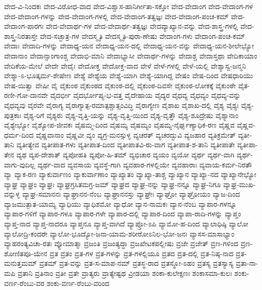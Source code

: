 {ವೇದ-ವಿ-ನಿಂದಕಃ
ವೇದ-ವಿರೋಧ-ವಾದ
ವೇದ-ವಿಶ್ವಾಸ-ಹಾನಿರ್ಗೀತಾ-ಸಕ್ತೋ
ವೇದ-ವೇದಾಂಗ
ವೇದ-ವೇದಾಂಗ-ಗಳ
ವೇದ-ವೇದಾಂಗ-ಗಳನ್ನು
ವೇದ-ವೇದಾಂಗ-ಗಳಲ್ಲಿ
ವೇದ-ವೇದಾಂಗ-ತತ್ವಜ್ಞಃ
ವೇದ-ವೇದಾಂಗ-ಪಂಚ-ಕಮ್
ವೇದ-ವೇದಾಂಗ-ಪಾರಗಃ
ವೇದ-ವೇದಾರ್ಥ-ಗಳ
ವೇದ-ವೇದಾರ್ಥ-ತತ್ವಜ್ಞಃ
ವೇದವ್ಯಾಖ್ಯಾನ-ವನ್ನು
ವೇದ-ಶಾಸ್ತ್ರ-ಗಳಲ್ಲಿ
ವೇದ-ಶಾಸ್ತ್ರ-ನಿರತಾಸ್ತೇ
ವೇದ-ಸಚ್ಛಾತ್ರ-ಗಳ
ವೇದಸ್ಮೃತಿ
ವೇದಸ್ಮೃತಿ-ಪುರಾ-ಣೇಷು
ವೇದಾಂಗ-ಗಳು
ವೇದಾಂಗ-ಪಂಚ-ಕಮ್
ವೇದಾಃ
ವೇದಾದಿ-ಗಳನ್ನು
ವೇದಾಧ್ಯ-ಯನ
ವೇದಾಧ್ಯ-ಯನ-ದಲ್ಲಿ
ವೇದಾಧ್ಯ-ಯನ-ವನ್ನು
ವೇದಾಧ್ಯ-ಯನ-ಶೀಲೇಭ್ಯೋ
ವೇದಾನಾಂ
ವೇದಾನ್ಸಾಂಗಾಂಶ್ಚ
ವೇದಾಭಿ-ಮಾನಿ
ವೇದಾಭ್ಯಾಸೀ
ವೇದಾರ್ಥ-ಗಳನ್ನು
ವೇದಾಶ್ಚ
ವೇದಾಸ್ತಥಾ
ವೇದಿಕಾಯಾಂ
ವೇದಿಕೆಯ-ಮೇಲೆ
ವೇದೇ
ವೇದೈಃ
ವೇದೋಕ್ತ
ವೇದೋಕ್ತ-ವಾದ
ವೇಳೆ
ವೇಳೆ-ಗಳಲ್ಲಿ
ವೇಳೆ-ಯಲ್ಲಿ
ವೇಶ್ಯಾಸ್ವ-ಜನ್ಮನಿ
ವೇಶ್ಯಾ-ಽ-ಭೂತ್ಕರ್ಮ-ಶೇಷೇಣ
ವೇಶ್ಯೆ
ವೇಶ್ಯೆಯ
ವೇಶ್ಯೆ-ಯಾಗಿ
ವೇಶ್ಯೆ-ಯಾಗಿದ್ದ
ವೇಷಂ
ವೇಷ-ದಿಂದ
ವೇಷಧಾರಿಯು
ವೇಷ-ಯಿತ್ವಾ
ವೇಷೀ
ವೈ
ವೈಕುಂಠ
ವೈಕುಂಠದ
ವೈಕುಂಠ-ದಲ್ಲಿ
ವೈಕುಂಠ-ದಿವಸೇ
ವೈಕುಂಠ-ಲೋಕಕ್ಕೆ
ವೈಕುಂಠೇ
ವೈತ-ರಣೀ-ಗೋ-ದಾನವೇ
ವೈದರ್ಭೀ
ವೈದರ್ಭೋಪ್ಯ-ಭ-ವತ್ತ
ವೈದೇಹಾಯ
ವೈದ್ಯರ
ವೈಧವ್ಯ
ವೈಧವ್ಯಂ
ವೈಧವ್ಯ-ವನ್ನು
ವೈಧವ್ಯವು
ವೈರವೇ
ವೈರಾಗ್ಯ
ವೈರಾಗ್ಯಾತ್ಪ-ರಮಾತ್ಪಶ್ಚಾತ್ಸಂವಿದ್ಧಿ
ವೈರಾಗ್ಯೇಣ
ವೈಶಾಖ
ವೈಶಾಖ-ದಲ್ಲಿ
ವೈಶ್ಯ
ವೈಶ್ಯಃ
ವೈಶ್ಯ-ಪುತ್ರಕಾಃ
ವೈಶ್ಯ-ರಿಗೆ
ವೈಶ್ಯರು
ವೈಶ್ಯ-ವೃತ್ತಿ-ಯನ್ನು
ವೈಶ್ಯ-ವೃತ್ತಿ-ಯಿಂದ
ವೈಶ್ಯ-ವೃತ್ತೌ
ವೈಶ್ಯ-ಶೂದ್ರೇಷು
ವೈಶ್ಯಾನಾಂ
ವೈಶ್ಯೇಭ್ಯೋ
ವೈಶ್ಯೋಪ-ಜೀವಕಃ
ವೈಷಮ್ಮ-ದಿಂದ
ವೈಷಮ್ಯ
ವೈಷಮ್ಯಂ
ವೈಷಮ್ಯ-ನೈರ್ಘೃಣ್ಯಾಧಿಕ-ರಣ
ವೈಷ್ಣವ
ವೈಷ್ಣವ-ಧರ್ಮ-ದಿಂದ
ವೈಷ್ಣವಾನಾಂ
ವೈಷ್ಣವೀ
ವ್ಯಂ
ವ್ಯಗ್ರ-ಮನಸ್ಸುಳ್ಳ
ವ್ಯಚರತ್
ವ್ಯಚರದ್ಭುವಿ
ವ್ಯಜಹಾರ
ವ್ಯತಿಕ್ರಮೇತ್
ವ್ಯತೀ-ತಾನಿ
ವ್ಯತೀತ್ಯೇವ
ವ್ಯತೀಪಾತ-ಗಳು
ವ್ಯತೀಪಾತ-ದಿಂದ
ವ್ಯತೀಪಾತವಿ-ರು-ವಾಗ
ವ್ಯತೀಪಾತ-ಶ-ತಾನಿ
ವ್ಯತೀಪಾತೇ
ವ್ಯತೀಪಾ-ತೇನ
ವ್ಯಥ
ವ್ಯಪ-ದೇಶಾತ್
ವ್ಯಪೋಹತಿ
ವ್ಯಪೋ-ಹಿ-ತಮ್
ವ್ಯಭಿಚಾರ
ವ್ಯಯಂ
ವ್ಯಯೋ
ವ್ಯರ್ಥ
ವ್ಯರ್ಥ-ವಾಗಿ
ವ್ಯರ್ಥ-ವಾಗು-ವುದಿಲ್ಲ
ವ್ಯರ್ಥ-ವಾದ
ವ್ಯವಸಾಯ
ವ್ಯವಸ್ಥೆ-ಗಾಗಿ
ವ್ಯವಹಾರ-ಗಳಲ್ಲಿಯೇ
ವ್ಯವಹಾರಾಃ
ವ್ಯವಾಯ-ಕರ್ಮ-ನಿರತೌ
ವ್ಯಾ
ವ್ಯಾಕ-ರಣ
ವ್ಯಾಕುರ್ವಾಣಂ
ವ್ಯಾಕುರ್ವಾಣಾಂ
ವ್ಯಾಖ್ಯಾತಂ
ವ್ಯಾಖ್ಯಾ-ತಾಶ್ಚ
ವ್ಯಾಖ್ಯಾನ
ವ್ಯಾಖ್ಯಾ-ನದ
ವ್ಯಾಖ್ಯಾನೇಭ್ಯೋ
ವ್ಯಾಘ್ರ
ವ್ಯಾಘ್ರಂ
ವ್ಯಾಘ್ರಃ
ವ್ಯಾಘ್ರಗ್ರಸಿತಮಗ್ರ-ಜಮ್
ವ್ಯಾಘ್ರದ
ವ್ಯಾಘ್ರ-ನನ್ನು
ವ್ಯಾಘ್ರ-ನನ್ನೂ
ವ್ಯಾಘ್ರ-ನಿಗೂ
ವ್ಯಾಘ್ರ-ಮುಖ-ವನ್ನುಳ್ಳ
ವ್ಯಾಘ್ರ-ಸಮಾನನಃ
ವ್ಯಾಘ್ರಾನನ-ನೆಂಬ
ವ್ಯಾಘ್ರಾನನಸ್ತು
ವ್ಯಾಘ್ರೇಃ
ವ್ಯಾಘ್ರೋ
ವ್ಯಾಘ್ರೋಯಂ
ವ್ಯಾಜ-ದಿಂದ
ವ್ಯಾಜಮುತ್ಪಾತ-ಯಾಮ್ಯ
ವ್ಯಾಧಿಯು
ವ್ಯಾಧಿಶಮೋ
ವ್ಯಾಧೋ
ವ್ಯಾನ-ನಾಮಕಃ
ವ್ಯಾನ-ನೆಂಬ
ವ್ಯಾಪಾರ-ಗಳನ್ನೂ
ವ್ಯಾಪಾರ-ಗಳಿಗೆ
ವ್ಯಾಪಾರ-ಗಳೂ
ವ್ಯಾಪಾರ-ಗಳೇ
ವ್ಯಾಪಾರ-ದಲ್ಲಿ
ವ್ಯಾಪಾರ-ದಿಂದ
ವ್ಯಾಪಾ-ರಾದಿ-ಗಳನ್ನು
ವ್ಯಾಪ್ತಂ
ವ್ಯಾಪ್ತ-ನಾದ
ವ್ಯಾಪ್ತ-ನಾದರೂ
ವ್ಯಾಪ್ತನೂ
ವ್ಯಾಪ್ತ-ವಾಗಿದೆ
ವ್ಯಾಪ್ತೋ-ಽಪಿ
ವ್ಯಾಮೋ-ಹ-ದಿಂದ
ವ್ಯಾಲಾಧಿಷ್ಠಿ
ವ್ಯಾಲೋ
ವ್ಯಾಲೋದ್ರಿ-ಕಂದರೇ
ವ್ಯಾಲೋ-ಭೂದ್ಯೋ-ಜನಾ-ಯಾಮ-ಶರೀರೋಽನಿಲ-ಭೋ-ಜನಃ
ವ್ಯಾಸಸ-ಮಾಸಾಭ್ಯಾಂ
ವ್ಯಾಹರಂತ್ಯವಿಚಾ-ರತಃ
ವ್ಯೋಮಾತ್ಮಾ
ವ್ರಜಂತಿ
ವ್ರಜಂತ್ಯದ್ಧಾ
ವ್ರಜಖೇಟಕಪಲ್ಲೀಷು
ವ್ರಜೇ
ವ್ರಜೇತ್
ವ್ರಣ-ಗಳಿಂದ
ವ್ರಣ-ಶೋಣಿತಪೂ-ಯೇನ
ವ್ರತ
ವ್ರತಂ
ವ್ರತ-ಗಳ
ವ್ರತ-ಗಳನ್ನು
ವ್ರತ-ಗಳಲ್ಲಿಯೂ
ವ್ರತದ
ವ್ರತ-ದಲ್ಲಿ
ವ್ರತ-ನಿಷ್ಠ-ನಾದ
ವ್ರತ-ಮನುತ್ತಮಮ್
ವ್ರತಮ್
ವ್ರತ-ವನ್ನು
ವ್ರತ-ಸ-ಮಾಪ-ನಮ್
ವ್ರತಸ್ಥ-ರಾದ
ವ್ರತಸ್ಥೋ-ಽಹಂ
ವ್ರತಸ್ಯ
ವ್ರತಸ್ಯಾಸ್ಯ
ವ್ರತಾ-ನಾ-ಮಪಿ
ವ್ರತಾನಿ
ವ್ರತಿನಾಂ
ವ್ರತೀ
ವ್ರತೇ
ವ್ರಾತ್ಯರು
ವ್ರಾತ್ಯೇಷ್ಟಥ
ವ್ರೀಡಯಾ
ಶಂಕಾ-ಕುಲೇಕ್ಷಣಃ
ಶಂಕಾಸಮಾ-ಕುಲಃ
ಶಂಕು-ವರ್ಣ-ರೆಂಬು-ವರ
ಶಂಕು-ವರ್ಣ-ರೆಂಬು-ವರಿಂದ
}
